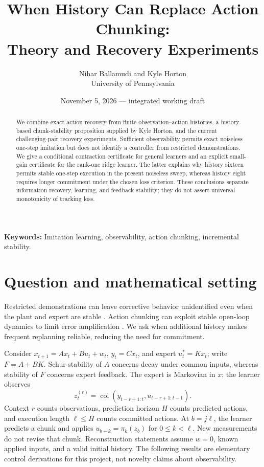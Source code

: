 \documentclass[11pt]{article}
\title{When History Can Replace Action Chunking:\\Theory and Recovery Experiments}
\author{Nihar Ballamudi and Kyle Horton\\University of Pennsylvania}
\date{November 5, 2026 --- integrated working draft}
\begin{document}
\maketitle
\begin{abstract}
We combine exact action recovery from finite observation--action histories, a history-based chunk-stability proposition supplied by Kyle Horton, and the current challenging-pair recovery experiments. Sufficient observability permits exact noiseless one-step imitation but does not identify a controller from restricted demonstrations. We give a conditional contraction certificate for general learners and an explicit small-gain certificate for the rank-one ridge learner. The latter explains why history sixteen permits stable one-step execution in the present noiseless sweep, whereas history eight requires longer commitment under the chosen loss criterion. These conclusions separate information recovery, learning, and feedback stability; they do not assert universal monotonicity of tracking loss.
\end{abstract}
\noindent\textbf{Keywords:} Imitation learning, observability, action chunking, incremental stability.

\section{Question and mathematical setting}
Restricted demonstrations can leave corrective behavior unidentified even when the plant and expert are stable \citep{simchowitz2025}. Action chunking can exploit stable open-loop dynamics to limit error amplification \citep{zhang2025}. We ask when additional history makes frequent replanning reliable, reducing the need for commitment.

Consider $x_{t+1}=Ax_t+Bu_t+w_t$, $y_t=Cx_t$, and expert $u_t^*=Kx_t$; write $F=A+BK$. Schur stability of $A$ concerns decay under common inputs, whereas stability of $F$ concerns expert feedback. The expert is Markovian in $x$; the learner observes
\[
z_t^{(r)}=\operatorname{col}(y_{t-r+1:t},u_{t-r+1:t-1}).
\]
Context $r$ counts observations, prediction horizon $H$ counts predicted actions, and execution length $\ell\le H$ counts committed actions. At $b=j\ell$, the learner predicts a chunk and applies $u_{b+k}=\pi_k(z_b)$ for $0\le k<\ell$. New measurements do not revise that chunk. Reconstruction statements assume $w=0$, known applied inputs, and a valid initial history. The following results are elementary control derivations for this project, not novelty claims about observability.
\end{document}
